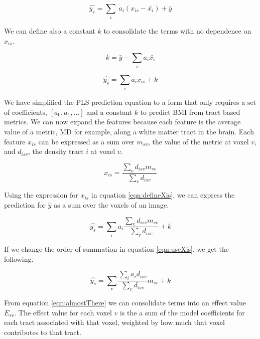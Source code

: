 \begin{equation}
\hat{y_s} = \displaystyle\sum_i\ a_i (x_{is} - \bar{x_i}) + \bar{y}
\end{equation}

We can define also a constant $k$ to consolidate the terms with no dependence on $x_{is}$.

\begin{equation}
k = \bar{y} - \sum_i {a_i\bar{x_i}}
\end{equation}

\begin{equation}
\hat{y_s} = \displaystyle\sum_i {a_i x_{is}} + k
\end{equation}

We have simplified the PLS prediction equation to a form that only requires a set of coefficients, $[a_0, a_1, ...]$ and a constant $k$ to predict BMI from tract based metrics. We can now expand the features because each feature is the average value of a metric, MD for example, along a white matter tract in the brain. Each feature $x_{is}$ can be expressed as a sum over $m_{sv}$, the value of the metric at voxel $v$, and $d_{isv}$, the density tract $i$ at voxel $v$.

\begin{equation} \label{eqn:defineXis}
x_{is} = \displaystyle\frac{\sum_v {d_{isv} m_{sv}}}{\sum_v {d_{isv}}}
\end{equation}

Using the expression for $x_{is}$ in equation \ref{eqn:defineXis}, we can express the prediction for $\hat{y}$ as a sum over the voxels of an image.

\begin{equation} \label{eqn:useXis}
\hat{y_s} = \displaystyle\sum_i {a_i \frac{\sum_v {d_{isv} m_{sv}}}{\sum_v {d_{isv}}}} + k
\end{equation}

If we change the order of summation in equation \ref{eqn:useXis}, we get the following.

\begin{equation} \label{eqn:almostThere}
\hat{y_s} = \displaystyle\sum_v{\frac{  \sum_i{ a_i d_{isv}}}{\sum_v {d_{isv}}} m_{sv}} + k
\end{equation}

From equation \ref{eqn:almostThere} we can consolidate terms into an effect value $E_{sv}$. The effect value for each voxel $v$ is the a sum of the model coefficients for each tract associated with that voxel, weighted by how much that voxel contributes to that tract.

